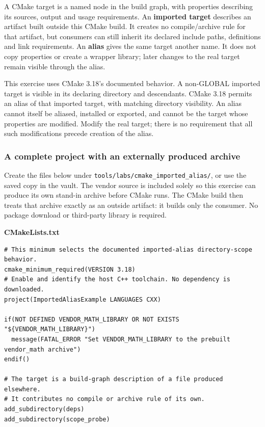 \hypertarget{05-engine-i-ch012-imported-targets-describe-external-artifacts-aliases-provide-a-stable-name}{}

A CMake target is a named node in the build graph, with properties describing its sources, output and usage requirements. An \textbf{imported target} describes an artifact built outside this CMake build. It creates no compile/archive rule for that artifact, but consumers can still inherit its declared include paths, definitions and link requirements. An \textbf{alias} gives the same target another name. It does not copy properties or create a wrapper library; later changes to the real target remain visible through the alias.

This exercise uses CMake 3.18's documented behavior. A non-GLOBAL imported target is visible in its declaring directory and descendants. CMake 3.18 permits an alias of that imported target, with matching directory visibility. An alias cannot itself be aliased, installed or exported, and cannot be the target whose properties are modified. Modify the real target; there is no requirement that all such modifications precede creation of the alias.

\subsubsection{A complete project with an externally produced archive}\label{05-engine-i-ch012-a-complete-project-with-an-externally-produced-archive}

\hypertarget{05-engine-i-ch012-a-complete-project-with-an-externally-produced-archive}{}

Create the files below under \texttt{tools/labs/cmake\_imported\_alias/}, or use the saved copy in the vault. The vendor source is included solely so this exercise can produce its own stand-in archive before CMake runs. The CMake build then treats that archive exactly as an outside artifact: it builds only the consumer. No package download or third-party library is required.

\textbf{CMakeLists.txt}

\begin{verbatim}
# This minimum selects the documented imported-alias directory-scope behavior.
cmake_minimum_required(VERSION 3.18)
# Enable and identify the host C++ toolchain. No dependency is downloaded.
project(ImportedAliasExample LANGUAGES CXX)

if(NOT DEFINED VENDOR_MATH_LIBRARY OR NOT EXISTS "${VENDOR_MATH_LIBRARY}")
  message(FATAL_ERROR "Set VENDOR_MATH_LIBRARY to the prebuilt vendor_math archive")
endif()

# The target is a build-graph description of a file produced elsewhere.
# It contributes no compile or archive rule of its own.
add_subdirectory(deps)
add_subdirectory(scope_probe)
\end{verbatim}

